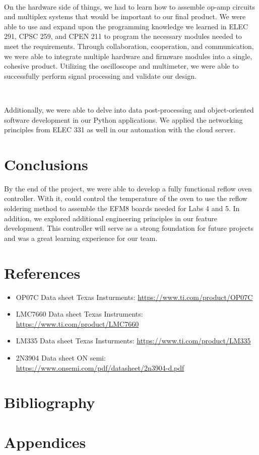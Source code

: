 \documentclass{article}
\begin{document}
\

\noindent On the hardware side of things, we had to learn how to assemble op-amp circuits and multiplex systems that would be important to our final product. We were able to use and expand upon the programming knowledge we learned in ELEC 291, CPSC 259, and CPEN 211 to program the necessary modules needed to meet the requirements. Through collaboration, cooperation, and communication, we were able to integrate multiple hardware and firmware modules into a single, cohesive product. Utilizing the oscilloscope and multimeter, we were able to successfully perform signal processing and validate our design.

\

\noindent Additionally, we were able to delve into data post-processing and object-oriented software development in our Python applications. We applied the networking principles from ELEC 331 as well in our
automation with the cloud server.

\section{Conclusions}
By the end of the project, we were able to develop a fully functional reflow oven controller. With it, could control the temperature of the oven to use the reflow soldering method to assemble the EFM8 boards needed for Labs 4 and 5. In addition, we explored additional engineering principles in our feature development. This controller will serve as a strong foundation for future projects and was a great learning experience for our team.

\section{References}
\begin{itemize}
  \item OP07C Data sheet Texas Insturments: \url{https://www.ti.com/product/OP07C}
  \item LMC7660 Data sheet Texas Instruments: \url{https://www.ti.com/product/LMC7660}
  \item LM335 Data sheet Texas Insturments: \url{https://www.ti.com/product/LM335}
  \item 2N3904 Data sheet ON semi: \url{https://www.onsemi.com/pdf/datasheet/2n3904-d.pdf}
\end{itemize}
\section{Bibliography}
\section{Appendices}
\end{document}
